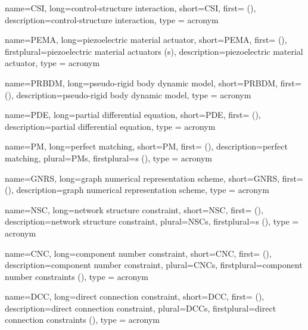 {
	name={CSI},
	long={control-structure interaction},
	short={CSI},
	first={} (),
	description={control-structure interaction},
	type = acronym
}

{
	name={PEMA},
	long={piezoelectric material actuator},
	short={PEMA},
	first={} (),
	firstplural={piezoelectric material actuators (s)},
	description={piezoelectric material actuator},
	type = acronym
}

{
	name={PRBDM},
	long={pseudo-rigid body dynamic model},
	short={PRBDM},
	first={} (),
	description={pseudo-rigid body dynamic model},
	type = acronym
}

{
	name={PDE},
	long={partial differential equation},
	short={PDE},
	first={} (),
	description={partial differential equation},
	type = acronym
}

{
	name={PM},
	long={perfect matching},
	short={PM},
	first={} (),
	description={perfect matching},
	plural={PMs},
	firstplural={s ()},
	type = acronym
}

{
	name={GNRS},
	long={graph numerical representation scheme},
	short={GNRS},
	first={} (),
	description={graph numerical representation scheme},
	type = acronym
}

{
	name={NSC},
	long={network structure constraint},
	short={NSC},
	first={} (),
	description={network structure constraint},
	plural={NSCs},
	firstplural={s ()},
	type = acronym
}

{
	name={CNC},
	long={component number constraint},
	short={CNC},
	first={} (),
	description={component number constraint},
	plural={CNCs},
	firstplural={component number constraints ()},
	type = acronym
}

{
	name={DCC},
	long={direct connection constraint},
	short={DCC},
	first={} (),
	description={direct connection constraint},
	plural={DCCs},
	firstplural={direct connection constraints ()},
	type = acronym
}

